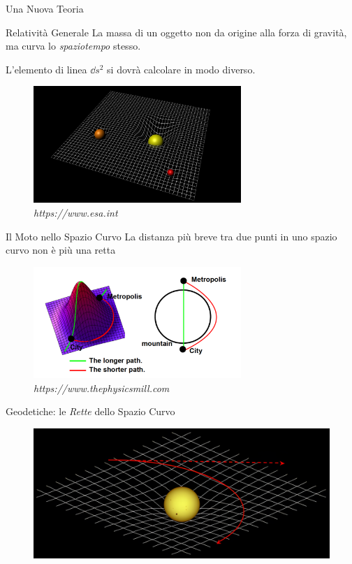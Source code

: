\begin{frame}{Una Nuova Teoria}

    \begin{block}{Relatività Generale}
        {La massa di un oggetto non da origine alla forza di gravità, ma curva
        lo \textit{spaziotempo} stesso.}
    \end{block}

    L'elemento di linea $\dd s^2$ si dovrà calcolare in modo diverso.

    \begin{figure}
        \centering
        \includegraphics[width=0.7\textwidth]{Figures/intro/spacetime_curvature.jpg}
        \caption{\textit{https://www.esa.int}}%
    \end{figure}

\end{frame}


\begin{frame}{Il Moto nello Spazio Curvo}
    La distanza più breve tra due punti in uno spazio curvo non è più una retta
    \begin{figure}
        \centering
        \includegraphics[width=0.7\textwidth]{Figures/intro/moutain_curved_space.png}
        \caption{\textit{https://www.thephysicsmill.com}}%
    \end{figure}

\end{frame}


\begin{frame}{Geodetiche: le \textit{Rette} dello Spazio Curvo}

    \begin{figure}
        \centering
        \includegraphics[width=\textwidth]{Figures/intro/geodesic-2884x1268-upscaled.png}
    \end{figure}

\end{frame}
